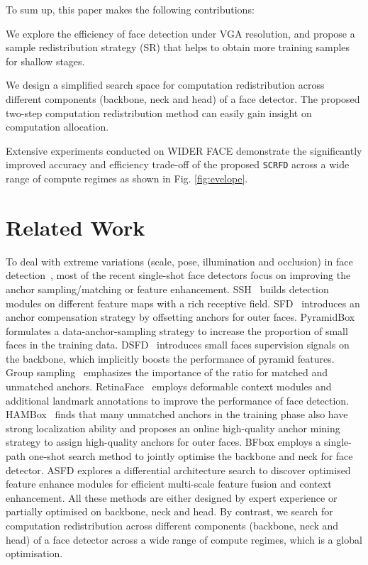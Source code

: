 \documentclass[10pt,twocolumn,letterpaper]{article}
\newcommand{\dsname}[1]{\texttt{\small #1}\xspace}
\newcommand{\scrfd}{\dsname{SCRFD}}
\newenvironment{tight_itemize}{
\begin{itemize}[leftmargin=20pt]
  \setlength{\topsep}{0pt}
  \setlength{\itemsep}{0pt}
  \setlength{\parskip}{0pt}
  \setlength{\parsep}{0pt}
}{\end{itemize}}
\begin{document}
To sum up, this paper makes the following contributions:
\begin{tight_itemize}
\setlength\itemsep{0em}
\item We explore the efficiency of face detection under VGA resolution, and propose a sample redistribution strategy (SR) that helps to obtain more training samples for shallow stages.

\item We design a simplified search space for computation redistribution across different components (backbone, neck and head) of a face detector. The proposed two-step computation redistribution method can easily gain insight on computation allocation.

\item Extensive experiments conducted on WIDER FACE demonstrate the significantly improved accuracy and efficiency trade-off of the proposed \scrfd across a wide range of compute regimes as shown in Fig. \ref{fig:evelope}. 
\end{tight_itemize}

\section{Related Work}
 To deal with extreme variations (\eg scale, pose, illumination and occlusion) in face detection~\cite{yang2016wider}, most of the recent single-shot face detectors focus on improving the anchor sampling/matching or feature enhancement.
SSH~\cite{najibi2017ssh} builds detection modules on different feature maps with a rich receptive field. SFD~\cite{zhang2017s3fd} introduces an anchor compensation strategy by offsetting anchors for outer faces. PyramidBox~\cite{tang2018pyramidbox} formulates a data-anchor-sampling strategy to increase the proportion of small faces in the training data. DSFD~\cite{li2019dsfd} introduces small faces supervision signals on the backbone, which implicitly boosts the performance of pyramid features. Group sampling~\cite{ming2019group} emphasizes the importance of the ratio for matched and unmatched anchors. RetinaFace~\cite{deng2019retinaface} employs deformable context modules and additional landmark annotations to improve the performance of face detection. HAMBox~\cite{liu2019hambox} finds that many unmatched anchors in the training phase also have strong localization ability and proposes an online high-quality anchor mining strategy to assign high-quality anchors for outer faces. BFbox \cite{liu2020bfbox} employs a single-path one-shot search method \cite{guo2019single} to jointly optimise the backbone and neck for face detector. ASFD \cite{zhang2020asfd} explores a differential architecture search to discover optimised feature enhance modules for efficient multi-scale feature fusion and context enhancement. All these methods are either designed by expert experience or partially optimised on backbone, neck and head. By contrast, we search for computation redistribution across different components (backbone, neck and head) of a face detector across a wide range of compute regimes, which is a global optimisation.
\end{document}
